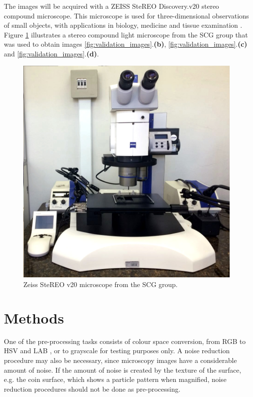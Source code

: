 The images will be acquired with a ZEISS SteREO Discovery.v20 stereo compound microscope. This microscope is used for three-dimensional observations of small objects, with applications in biology, medicine and tissue examination \cite{stereo2012carl}. Figure \ref{fig:stereo_v20} illustrates a stereo compound light microscope from the SCG group that was used to obtain images \ref{fig:validation_images}.\textbf{(b)}, \ref{fig:validation_images}.\textbf{(c) }and \ref{fig:validation_images}.\textbf{(d)}.

\begin{figure}[H]
	\centering
	\caption{\label{fig:stereo_v20}Zeiss SteREO v20 microscope from the SCG group.}
	\begin{center}
	    \includegraphics[scale=0.3]{images/fig14.png}
	\end{center}
	\centering
    \fautor
\end{figure}

\section{Methods}

One of the pre-processing tasks consists of colour space conversion, from RGB to HSV and LAB , or to grayscale for testing purposes only. A noise reduction procedure may also be necessary, since microscopy images have a considerable amount of noise. If the amount of noise is created by the texture of the surface, e.g. the coin surface, which shows a particle pattern when magnified, noise reduction procedures should not be done as pre-processing.

